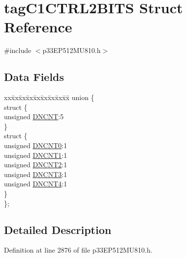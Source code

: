 \hypertarget{structtag_c1_c_t_r_l2_b_i_t_s}{}\section{tag\+C1\+C\+T\+R\+L2\+B\+I\+TS Struct Reference}
\label{structtag_c1_c_t_r_l2_b_i_t_s}


{\ttfamily \#include $<$p33\+E\+P512\+M\+U810.\+h$>$}

\subsection*{Data Fields}
\begin{DoxyCompactItemize}
\item 
\begin{tabbing}
xx\=xx\=xx\=xx\=xx\=xx\=xx\=xx\=xx\=\kill
union \{\\
\>struct \{\\
\>\>unsigned \hyperlink{structtag_c1_c_t_r_l2_b_i_t_s_ac95b93c4e5b0b451c30d758414b2faa6}{DNCNT}:5\\
\>\} \\
\>struct \{\\
\>\>unsigned \hyperlink{structtag_c1_c_t_r_l2_b_i_t_s_ae3204f0416c5ee268b1bacbc668b0c06}{DNCNT0}:1\\
\>\>unsigned \hyperlink{structtag_c1_c_t_r_l2_b_i_t_s_af8a600830557fb9feb4577ece303933b}{DNCNT1}:1\\
\>\>unsigned \hyperlink{structtag_c1_c_t_r_l2_b_i_t_s_a1a347041cec37b585f3e4809f26e742b}{DNCNT2}:1\\
\>\>unsigned \hyperlink{structtag_c1_c_t_r_l2_b_i_t_s_aefe3e090728f03e982e016058f54196e}{DNCNT3}:1\\
\>\>unsigned \hyperlink{structtag_c1_c_t_r_l2_b_i_t_s_afeca93a17ca8b9136cf43834d3c30f1e}{DNCNT4}:1\\
\>\} \\
\}; \\

\end{tabbing}\end{DoxyCompactItemize}


\subsection{Detailed Description}


Definition at line 2876 of file p33\+E\+P512\+M\+U810.\+h.



